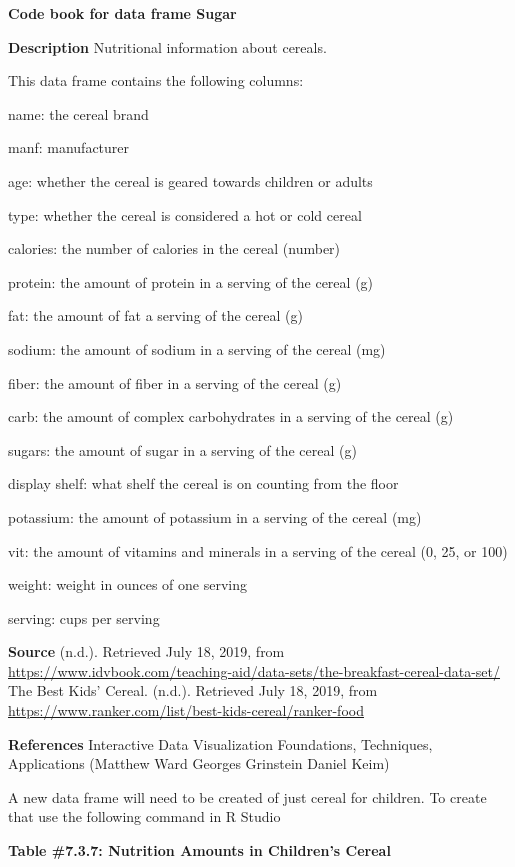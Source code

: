 \documentclass[
]{book}
\newenvironment{Shaded}{\begin{snugshade}}{\end{snugshade}}
\newcommand{\KeywordTok}[1]{\textcolor[rgb]{0.13,0.29,0.53}{\textbf{#1}}}
\newcommand{\NormalTok}[1]{#1}
\newcommand{\OperatorTok}[1]{\textcolor[rgb]{0.81,0.36,0.00}{\textbf{#1}}}
\newcommand{\StringTok}[1]{\textcolor[rgb]{0.31,0.60,0.02}{#1}}
\begin{document}
\textbf{Code book for data frame Sugar}

\textbf{Description}
Nutritional information about cereals.

This data frame contains the following columns:

name: the cereal brand

manf: manufacturer

age: whether the cereal is geared towards children or adults

type: whether the cereal is considered a hot or cold cereal

calories: the number of calories in the cereal (number)

protein: the amount of protein in a serving of the cereal (g)

fat: the amount of fat a serving of the cereal (g)

sodium: the amount of sodium in a serving of the cereal (mg)

fiber: the amount of fiber in a serving of the cereal (g)

carb: the amount of complex carbohydrates in a serving of the cereal (g)

sugars: the amount of sugar in a serving of the cereal (g)

display shelf: what shelf the cereal is on counting from the floor

potassium: the amount of potassium in a serving of the cereal (mg)

vit: the amount of vitamins and minerals in a serving of the cereal (0, 25, or 100)

weight: weight in ounces of one serving

serving: cups per serving

\textbf{Source}
(n.d.). Retrieved July 18, 2019, from \url{https://www.idvbook.com/teaching-aid/data-sets/the-breakfast-cereal-data-set/}
The Best Kids' Cereal. (n.d.). Retrieved July 18, 2019, from \url{https://www.ranker.com/list/best-kids-cereal/ranker-food}

\textbf{References}
Interactive Data Visualization
Foundations, Techniques, Applications (Matthew Ward \textbar{} Georges Grinstein \textbar{} Daniel Keim)

A new data frame will need to be created of just cereal for children. To create that use the following command in R Studio

\textbf{Table \#7.3.7: Nutrition Amounts in Children's Cereal}

\begin{Shaded}
\end{Shaded}
\end{document}
